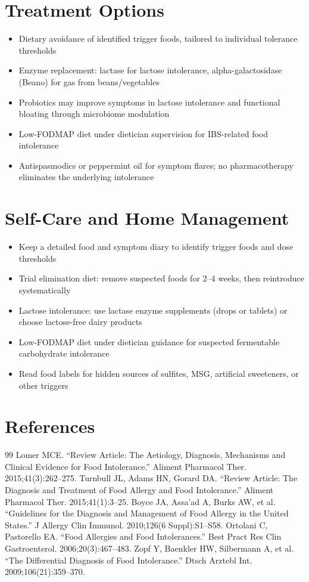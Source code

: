 \section*{Treatment Options}
\begin{itemize}
  \item Dietary avoidance of identified trigger foods, tailored to individual tolerance thresholds
  \item Enzyme replacement: lactase for lactose intolerance, alpha-galactosidase (Beano) for gas from beans/vegetables
  \item Probiotics may improve symptoms in lactose intolerance and functional bloating through microbiome modulation
  \item Low-FODMAP diet under dietician supervision for IBS-related food intolerance
  \item Antispasmodics or peppermint oil for symptom flares; no pharmacotherapy eliminates the underlying intolerance
\end{itemize}

\section*{Self-Care and Home Management}
\begin{itemize}
  \item Keep a detailed food and symptom diary to identify trigger foods and dose thresholds
  \item Trial elimination diet: remove suspected foods for 2--4 weeks, then reintroduce systematically
  \item Lactose intolerance: use lactase enzyme supplements (drops or tablets) or choose lactose-free dairy products
  \item Low-FODMAP diet under dietician guidance for suspected fermentable carbohydrate intolerance
  \item Read food labels for hidden sources of sulfites, MSG, artificial sweeteners, or other triggers
\end{itemize}

\section*{References}
\begin{thebibliography}{99}
 Lomer MCE. ``Review Article: The Aetiology, Diagnosis, Mechanisms and Clinical Evidence for Food Intolerance.'' Aliment Pharmacol Ther. 2015;41(3):262--275.
 Turnbull JL, Adams HN, Gorard DA. ``Review Article: The Diagnosis and Treatment of Food Allergy and Food Intolerance.'' Aliment Pharmacol Ther. 2015;41(1):3--25.
 Boyce JA, Assa'ad A, Burks AW, et al. ``Guidelines for the Diagnosis and Management of Food Allergy in the United States.'' J Allergy Clin Immunol. 2010;126(6 Suppl):S1--S58.
 Ortolani C, Pastorello EA. ``Food Allergies and Food Intolerances.'' Best Pract Res Clin Gastroenterol. 2006;20(3):467--483.
 Zopf Y, Baenkler HW, Silbermann A, et al. ``The Differential Diagnosis of Food Intolerance.'' Dtsch Arztebl Int. 2009;106(21):359--370.
\end{thebibliography}
